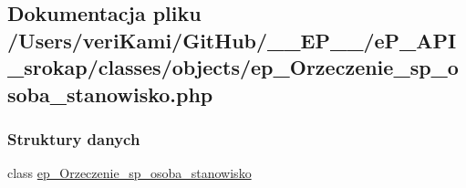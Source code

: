 \hypertarget{ep___orzeczenie__sp__osoba__stanowisko_8php}{\subsection{Dokumentacja pliku /\-Users/veri\-Kami/\-Git\-Hub/\-\_\-\-\_\-\-E\-P\-\_\-\-\_\-/e\-P\-\_\-\-A\-P\-I\-\_\-srokap/classes/objects/ep\-\_\-\-Orzeczenie\-\_\-sp\-\_\-osoba\-\_\-stanowisko.php}
\label{ep___orzeczenie__sp__osoba__stanowisko_8php}
}
\subsubsection*{Struktury danych}
\begin{DoxyCompactItemize}
\item 
class \hyperlink{classep___orzeczenie__sp__osoba__stanowisko}{ep\-\_\-\-Orzeczenie\-\_\-sp\-\_\-osoba\-\_\-stanowisko}
\end{DoxyCompactItemize}
